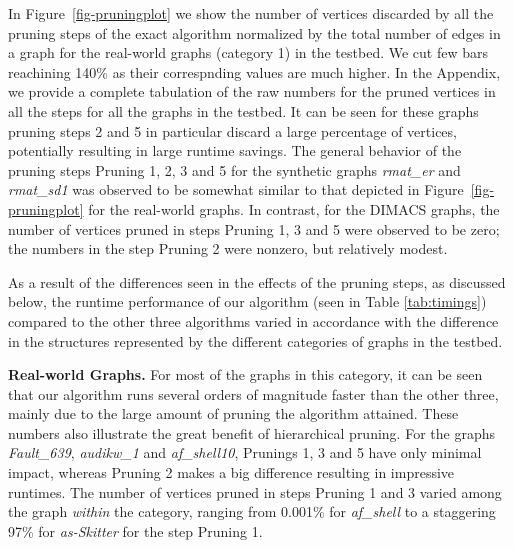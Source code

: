 In Figure~\ref{fig-pruningplot} we show the number of vertices discarded by all
the  pruning steps of the exact algorithm normalized by the total number of edges
in a graph for the real-world graphs (category 1) in the testbed. We cut few bars reachining
140\% as their correspnding values are much higher.
In the Appendix, we provide a complete tabulation of the raw numbers for the pruned vertices in all the steps for all the graphs in the testbed. It can be seen for these graphs pruning steps 2 and 5 in particular discard a large percentage of vertices, potentially resulting in large runtime savings. The general behavior of the pruning steps Pruning 1, 2, 3 and 5 for the synthetic graphs {\em rmat\_er} and {\em rmat\_sd1} was observed to be somewhat similar to that depicted in Figure~\ref{fig-pruningplot} for the real-world graphs. In contrast, for the DIMACS graphs, the number of vertices pruned in steps Pruning 1, 3 and 5 were observed to be zero; the numbers in the step Pruning 2 were nonzero, but relatively modest.

As a result  of the differences seen in the effects of the pruning steps, as discussed below,
the runtime performance of our algorithm (seen in Table \ref{tab:timings}) compared
to the other three algorithms varied in accordance with the difference in the structures represented 
by the different categories of graphs in the testbed.

{\bf Real-world Graphs. }
For most of the graphs in this category, it can be seen that our algorithm runs several orders of magnitude faster than the other three, mainly due to the large amount of pruning the algorithm attained. These numbers also illustrate the great benefit of hierarchical pruning. 
For the graphs {\em Fault\_639}, {\em audikw\_1} and {\em af\_shell10}, 
Prunings 1, 3 and 5 have only minimal impact,
whereas Pruning 2 makes a big difference resulting in impressive runtimes. 
The number of vertices pruned in steps Pruning 1 and 3 varied among the 
graph {\em within} the
category, ranging from 0.001\% for {\it af\_shell} to a staggering 97\% for {\it as-Skitter} 
for the step Pruning 1. 

